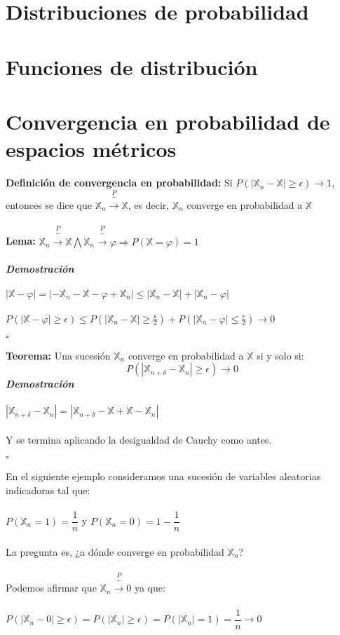 \documentclass[12pt,a4paper,openright]{book}
\begin{document}
\section{Distribuciones de probabilidad}
\section{Funciones de distribución}
\section{Convergencia en probabilidad de espacios métricos}
\textbf{Definición de convergencia en probabilidad:} Si $P(| \mathbb{X}_n- \mathbb{X} | \geq\epsilon)\rightarrow 1$, entonces se dice que $\mathbb{X}_n\overbrace{\longrightarrow}^P \mathbb{X}$, es decir, $\mathbb{X}_n$ converge en probabilidad a $\mathbb{X}$
\\\\
\textbf{Lema:} $\mathbb{X}_n\overbrace{\longrightarrow}^P \mathbb{X} \bigwedge \mathbb{X}_n\overbrace{\longrightarrow}^P \mathbb{\varphi}\Longrightarrow P(\mathbb{X}=\varphi)=1$\\\\
\textit{\textbf{Demostración}}\\\\
$| \mathbb{X}-\varphi |=|-\mathbb{X}_n - \mathbb{X}-\varphi + \mathbb{X}_n | \leq |\mathbb{X}_n - \mathbb{X}|+|\mathbb{X}_n-\varphi |$\\\\
$P(| \mathbb{X}- \varphi | \geq\epsilon)\leq P(| \mathbb{X}_n- \mathbb{X} | \geq\frac{\epsilon}{2})+P(| \mathbb{X}_n- \varphi | \leq\frac{\epsilon}{2})\rightarrow 0$
\begin{flushright}
$\square$
\end{flushright}
\textbf{Teorema:} Una sucesión $\mathbb{X}_n$ converge en probabilidad a $\mathbb{X}$ si y solo si:
$$P(| \mathbb{X}_{n+\delta}-\mathbb{X}_n |\geq\epsilon)\longrightarrow 0$$
\textit{\textbf{Demostración}}\\\\
 $| \mathbb{X}_{n+\delta}-\mathbb{X}_n |= |   \mathbb{X}_{n+\delta}-\mathbb{X}+\mathbb{X}-\mathbb{X}_n  |$\\\\
 Y se termina aplicando la desigualdad de Cauchy como antes.
 \begin{flushright}
$\square$
\end{flushright}
En el siguiente ejemplo consideramos una sucesión de variables aleatorias indicadoras tal que:\\\\
$P(\mathbb{X}_n=1)=\dfrac{1}{n}$ y $P(\mathbb{X}_n=0)=1-\dfrac{1}{n}$\\\\
La pregunta es, ¿a dónde converge en probabilidad $\mathbb{X}_n$?\\\\
Podemos afirmar que $\mathbb{X}_n\overbrace{\longrightarrow}^P 0$ ya que:\\\\
$P ( | \mathbb{X}_n - 0 | \geq\epsilon)=P(| \mathbb{X}_n | \geq\epsilon)=P(| \mathbb{X}_n | =1)=\dfrac{1}{n}\rightarrow 0$
\end{document}
